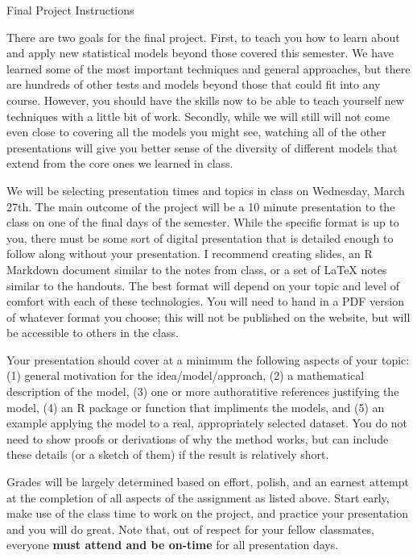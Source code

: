 \documentclass{tufte-handout}
\begin{document}
\justify

{\LARGE Final Project Instructions}

\vspace*{18pt}

\noindent
There are two goals for the final project. First, to teach you how
to learn about and apply new statistical models beyond those covered
this semester. We have learned some of the most important techniques
and general approaches, but there are hundreds of other tests and
models beyond those that could fit into any course. However, you should
have the skills now to be able to teach yourself new techniques
with a little bit of work. Secondly, while we will still will not
come even close to covering all the models you might see, watching
all of the other presentations will give you better sense of the 
diversity of different models that extend from the core ones we
learned in class.

\vspace*{18pt}

\noindent
We will be selecting presentation times and topics in class on
Wednesday, March 27th. The main outcome of the project will be a
10 minute presentation to the class on one of the final days of the
semester. While the specific format is up to you, there must be some
sort of digital presentation that is detailed enough to follow along
without your presentation. I recommend creating slides, an R Markdown
document similar to the notes from class, or a set of LaTeX notes 
similar to the handouts. The best format will depend on your topic
and level of comfort with each of these technologies. You will need
to hand in a PDF version of whatever format you choose; this will not
be published on the website, but will be accessible to others in the
class.

\vspace*{18pt}

\noindent
Your presentation should cover at a minimum the following aspects of
your topic: (1) general motivation for the idea/model/approach, (2)
a mathematical description of the model, (3) one or more authoratitive
references justifying the model, (4) an R package or function that 
impliments the models, and (5) an example applying the model to a real,
appropriately selected dataset. You do not need to show proofs or
derivations of why the method works, but can include these details (or
a sketch of them) if the result is relatively short.

\vspace*{18pt}

\noindent
Grades will be largely determined based on effort, polish, and an 
earnest attempt at the completion of all aspects of the assignment
as listed above. Start early, make use of the class time to work on
the project, and practice your presentation and you will do great.
Note that, out of respect for your fellow classmates, everyone
\textbf{must attend and be on-time} for all presentation days.
\end{document}
